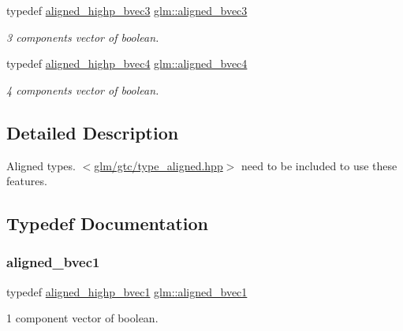 \begin{DoxyCompactItemize}
typedef \mbox{\hyperlink{group__gtc__type__aligned_gadd773554f8ca95a959a269252ad20738}{aligned\+\_\+highp\+\_\+bvec3}} \mbox{\hyperlink{group__gtc__type__aligned_ga853a573b554adb2181d9ca23907f8a85}{glm\+::aligned\+\_\+bvec3}}
\begin{DoxyCompactList}\small\item\em 3 components vector of boolean. \end{DoxyCompactList}\item 
typedef \mbox{\hyperlink{group__gtc__type__aligned_ga2e41bbaacd4df8babd91b4e2f21cb8dd}{aligned\+\_\+highp\+\_\+bvec4}} \mbox{\hyperlink{group__gtc__type__aligned_gaa62e46e15c76ced942cdeba89776c5f6}{glm\+::aligned\+\_\+bvec4}}
\begin{DoxyCompactList}\small\item\em 4 components vector of boolean. \end{DoxyCompactList}\end{DoxyCompactItemize}


\subsection{Detailed Description}
Aligned types. $<$\mbox{\hyperlink{gtc_2type__aligned_8hpp}{glm/gtc/type\+\_\+aligned.\+hpp}}$>$ need to be included to use these features. 



\subsection{Typedef Documentation}
\mbox{\label{group__gtc__type__aligned_ga7db5fd015b60682f3fdfe9cab47188dd}} 
\subsubsection{\texorpdfstring{aligned\_bvec1}{aligned\_bvec1}}
{\footnotesize\ttfamily typedef \mbox{\hyperlink{group__gtc__type__aligned_ga3e78791d8be2a1766bc7bc9d666f0f7f}{aligned\+\_\+highp\+\_\+bvec1}} \mbox{\hyperlink{group__gtc__type__aligned_ga7db5fd015b60682f3fdfe9cab47188dd}{glm\+::aligned\+\_\+bvec1}}}



1 component vector of boolean. 



